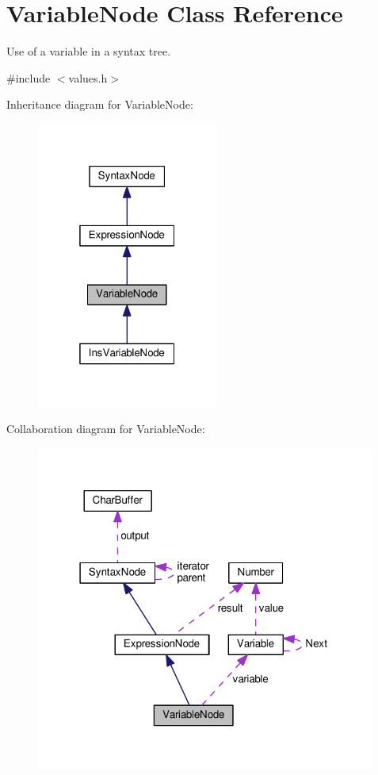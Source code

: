 \hypertarget{classVariableNode}{}\section{Variable\+Node Class Reference}
\label{classVariableNode}


Use of a variable in a syntax tree.  




{\ttfamily \#include $<$values.\+h$>$}



Inheritance diagram for Variable\+Node\+:\nopagebreak
\begin{figure}[H]
\begin{center}
\leavevmode
\includegraphics[width=169pt]{classVariableNode__inherit__graph}
\end{center}
\end{figure}


Collaboration diagram for Variable\+Node\+:\nopagebreak
\begin{figure}[H]
\begin{center}
\leavevmode
\includegraphics[width=316pt]{classVariableNode__coll__graph}
\end{center}
\end{figure}
